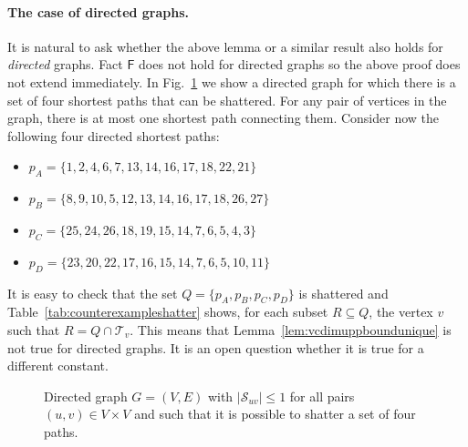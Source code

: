 \paragraph{The case of directed graphs.} It is natural to ask whether the above
lemma or a similar result also holds for \emph{directed} graphs. Fact
$\mathsf{F}$ does not hold for directed graphs so the above proof does not
extend immediately. In Fig.~\ref{fig:counterexample} we show a directed graph
for which there is a set of four shortest paths that can be shattered. For any
pair of vertices in the graph, there is at most one shortest path connecting
them. Consider now the following four directed shortest paths:
\begin{itemize}
  \item $p_A=\{1,2,4,6,7,13,14,16,17,18,22,21\}$
  \item $p_B=\{8,9,10,5,12,13,14,16,17,18,26,27\}$
  \item $p_C=\{25,24,26,18,19,15,14,7,6,5,4,3\}$
  \item $p_D=\{23,20,22,17,16,15,14,7,6,5,10,11\}$
\end{itemize}
It is easy to check that the set $Q=\{p_A,p_B,p_C,p_D\}$ is shattered and
Table~\ref{tab:counterexampleshatter} shows, for each subset $R\subseteq Q$, the
vertex $v$ such that $R=Q\cap\mathcal{T}_v$. This means that
Lemma~\ref{lem:vcdimuppboundunique} is not true for directed graphs. It is an
open question whether it is true for a different constant.

\begin{figure}
\centering
{}
\caption{Directed graph $G=(V,E)$ with $|\mathcal{S}_{uv}|\le1$ for all pairs
$(u,v)\in V\times V$ and such that it is possible to shatter a set of four
paths.}
\label{fig:counterexample}
\end{figure}

